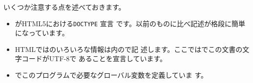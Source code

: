 いくつか注意する点を述べておきます。
\begin{itemize}
 \item {}がHTML5における\texttt{DOCTYPE} 宣言
です。以前のものに比べ記述が格段に簡単になっています。
\iffalse%
 \item \Line{NS}の\Elm{html}でこの文書の\keyitem{名前空間}を
\texttt{http://www.w3.org/1999/xhtml}と宣言しています。
\fi
  \item HTMLでは\HTML のいろいろな情報は内ので記
	述します。ここではでこの文書の文字コードがUTF-8で
	あることを宣言しています。
 \item {}でこのプログラムで必要なグローバル変数を定義していま
       す。
\end{itemize}
